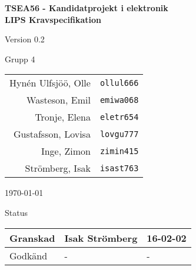 \documentclass[11pt]{article}
\begin{document}
\begin{titlepage}
\begin{center}

{\Large\bfseries TSEA56 - Kandidatprojekt i elektronik \\ LIPS Kravspecifikation}

\vspace{5em}

Version 0.2

\vspace{5em}
%
Grupp 4 \\
\begin{tabular}{rl}
Hynén Ulfsjöö, Olle&\verb+ollul666+
\\
Wasteson, Emil&\verb+emiwa068+
\\
Tronje, Elena&\verb+eletr654+
\\
Gustafsson, Lovisa&\verb+lovgu777+
\\
Inge, Zimon&\verb+zimin415+
\\
Strömberg, Isak&\verb+isast763+
\\
\end{tabular}

\vspace{5em}
\today

\vspace{18em}
Status
\begin{longtable}{|l|l|l|} \hline

Granskad & Isak Strömberg & 16-02-02 \\ \hline
Godkänd & - & - \\ \hline
 
\end{longtable}

\end{center}
\end{titlepage}
\end{document}
